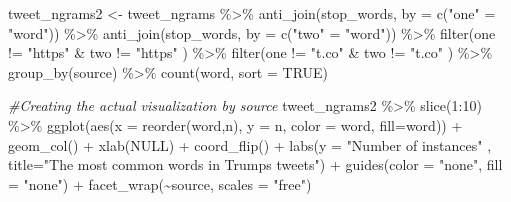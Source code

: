 \documentclass[
]{article}
\newenvironment{Shaded}{\begin{snugshade}}{\end{snugshade}}
\newcommand{\AttributeTok}[1]{\textcolor[rgb]{0.77,0.63,0.00}{#1}}
\newcommand{\CommentTok}[1]{\textcolor[rgb]{0.56,0.35,0.01}{\textit{#1}}}
\newcommand{\ConstantTok}[1]{\textcolor[rgb]{0.00,0.00,0.00}{#1}}
\newcommand{\DecValTok}[1]{\textcolor[rgb]{0.00,0.00,0.81}{#1}}
\newcommand{\FunctionTok}[1]{\textcolor[rgb]{0.00,0.00,0.00}{#1}}
\newcommand{\NormalTok}[1]{#1}
\newcommand{\OtherTok}[1]{\textcolor[rgb]{0.56,0.35,0.01}{#1}}
\newcommand{\SpecialCharTok}[1]{\textcolor[rgb]{0.00,0.00,0.00}{#1}}
\newcommand{\StringTok}[1]{\textcolor[rgb]{0.31,0.60,0.02}{#1}}
\begin{document}
\begin{Shaded}
\begin{Highlighting}[]
\NormalTok{tweet\_ngrams2 }\OtherTok{\textless{}{-}}\NormalTok{ tweet\_ngrams }\SpecialCharTok{\%\textgreater{}\%}
  \FunctionTok{anti\_join}\NormalTok{(stop\_words, }\AttributeTok{by =} \FunctionTok{c}\NormalTok{(}\StringTok{"one"} \OtherTok{=} \StringTok{"word"}\NormalTok{)) }\SpecialCharTok{\%\textgreater{}\%}
  \FunctionTok{anti\_join}\NormalTok{(stop\_words, }\AttributeTok{by =} \FunctionTok{c}\NormalTok{(}\StringTok{"two"} \OtherTok{=} \StringTok{"word"}\NormalTok{)) }\SpecialCharTok{\%\textgreater{}\%}
  \FunctionTok{filter}\NormalTok{(one }\SpecialCharTok{!=} \StringTok{"https"} \SpecialCharTok{\&}\NormalTok{ two }\SpecialCharTok{!=} \StringTok{"https"}\NormalTok{ ) }\SpecialCharTok{\%\textgreater{}\%}
  \FunctionTok{filter}\NormalTok{(one }\SpecialCharTok{!=} \StringTok{"t.co"} \SpecialCharTok{\&}\NormalTok{ two }\SpecialCharTok{!=} \StringTok{"t.co"}\NormalTok{ ) }\SpecialCharTok{\%\textgreater{}\%}
  \FunctionTok{group\_by}\NormalTok{(source) }\SpecialCharTok{\%\textgreater{}\%}
  \FunctionTok{count}\NormalTok{(word, }\AttributeTok{sort =} \ConstantTok{TRUE}\NormalTok{)}

\CommentTok{\#Creating the actual visualization by source}
\NormalTok{tweet\_ngrams2 }\SpecialCharTok{\%\textgreater{}\%}
  \FunctionTok{slice}\NormalTok{(}\DecValTok{1}\SpecialCharTok{:}\DecValTok{10}\NormalTok{) }\SpecialCharTok{\%\textgreater{}\%}
  \FunctionTok{ggplot}\NormalTok{(}\FunctionTok{aes}\NormalTok{(}\AttributeTok{x =} \FunctionTok{reorder}\NormalTok{(word,n), }\AttributeTok{y =}\NormalTok{ n, }\AttributeTok{color =}\NormalTok{ word, }\AttributeTok{fill=}\NormalTok{word)) }\SpecialCharTok{+}
  \FunctionTok{geom\_col}\NormalTok{() }\SpecialCharTok{+} 
  \FunctionTok{xlab}\NormalTok{(}\ConstantTok{NULL}\NormalTok{) }\SpecialCharTok{+}
  \FunctionTok{coord\_flip}\NormalTok{() }\SpecialCharTok{+}
  \FunctionTok{labs}\NormalTok{(}\AttributeTok{y =} \StringTok{"Number of instances"}
\NormalTok{       , }\AttributeTok{title=}\StringTok{"The most common words in Trump\textquotesingle{}s tweets"}\NormalTok{) }\SpecialCharTok{+}
  \FunctionTok{guides}\NormalTok{(}\AttributeTok{color =} \StringTok{"none"}\NormalTok{, }\AttributeTok{fill =} \StringTok{"none"}\NormalTok{) }\SpecialCharTok{+} 
  \FunctionTok{facet\_wrap}\NormalTok{(}\SpecialCharTok{\textasciitilde{}}\NormalTok{source, }\AttributeTok{scales =} \StringTok{"free"}\NormalTok{)}
\end{Highlighting}
\end{Shaded}
\end{document}
